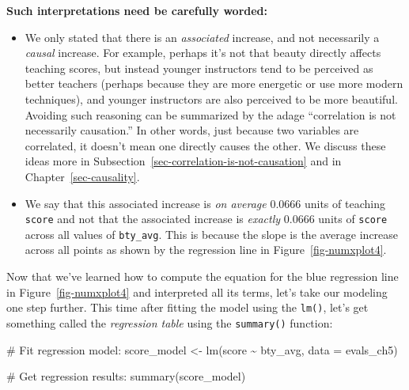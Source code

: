 \documentclass[
  letterpaper,
  DIV=11,
  numbers=noendperiod]{scrreprt}
\newenvironment{Shaded}{\begin{snugshade}}{\end{snugshade}}
\newcommand{\AttributeTok}[1]{\textcolor[rgb]{0.40,0.45,0.13}{#1}}
\newcommand{\CommentTok}[1]{\textcolor[rgb]{0.37,0.37,0.37}{#1}}
\newcommand{\FunctionTok}[1]{\textcolor[rgb]{0.28,0.35,0.67}{#1}}
\newcommand{\NormalTok}[1]{\textcolor[rgb]{0.00,0.23,0.31}{#1}}
\newcommand{\OtherTok}[1]{\textcolor[rgb]{0.00,0.23,0.31}{#1}}
\newcommand{\SpecialCharTok}[1]{\textcolor[rgb]{0.37,0.37,0.37}{#1}}
\theoremstyle{definition}
\theoremstyle{remark}
\begin{document}
\begin{tcolorbox}[enhanced jigsaw, coltitle=black, toprule=.15mm, bottomtitle=1mm, breakable, leftrule=.75mm, title=\textcolor{quarto-callout-important-color}{\faExclamation}\hspace{0.5em}{Important}, opacitybacktitle=0.6, colback=white, rightrule=.15mm, opacityback=0, toptitle=1mm, colbacktitle=quarto-callout-important-color!10!white, colframe=quarto-callout-important-color-frame, titlerule=0mm, arc=.35mm, bottomrule=.15mm, left=2mm]

\textbf{Such interpretations need be carefully worded:}

\begin{itemize}
\item
  We only stated that there is an \emph{associated} increase, and not
  necessarily a \emph{causal} increase. For example, perhaps it's not
  that beauty directly affects teaching scores, but instead younger
  instructors tend to be perceived as better teachers (perhaps because
  they are more energetic or use more modern techniques), and younger
  instructors are also perceived to be more beautiful. Avoiding such
  reasoning can be summarized by the adage ``correlation is not
  necessarily causation.'' In other words, just because two variables
  are correlated, it doesn't mean one directly causes the other. We
  discuss these ideas more in
  Subsection~\ref{sec-correlation-is-not-causation} and in
  Chapter~\ref{sec-causality}.
\item
  We say that this associated increase is \emph{on average} 0.0666 units
  of teaching \texttt{score} and not that the associated increase is
  \emph{exactly} 0.0666 units of \texttt{score} across all values of
  \texttt{bty\_avg}. This is because the slope is the average increase
  across all points as shown by the regression line in
  Figure~\ref{fig-numxplot4}.
\end{itemize}

\end{tcolorbox}

Now that we've learned how to compute the equation for the blue
regression line in Figure~\ref{fig-numxplot4} and interpreted all its
terms, let's take our modeling one step further. This time after fitting
the model using the \texttt{lm()}, let's get something called the
\emph{regression table} using the \texttt{summary()} function:

\begin{Shaded}
\begin{Highlighting}[]
\CommentTok{\# Fit regression model:}
\NormalTok{score\_model }\OtherTok{\textless{}{-}} \FunctionTok{lm}\NormalTok{(score }\SpecialCharTok{\textasciitilde{}}\NormalTok{ bty\_avg, }\AttributeTok{data =}\NormalTok{ evals\_ch5)}

\CommentTok{\# Get regression results:}
\FunctionTok{summary}\NormalTok{(score\_model)}
\end{Highlighting}
\end{Shaded}
\end{document}
